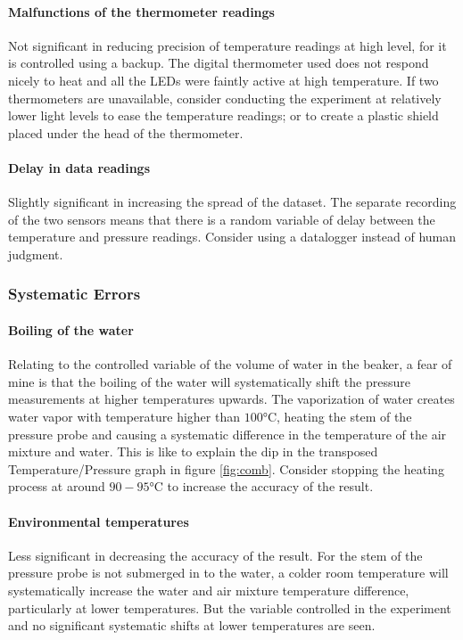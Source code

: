\documentclass[a4paper,12pt]{article}
\begin{document}
\paragraph{Malfunctions of the thermometer readings}
Not significant in reducing precision of temperature readings at high level, for it is controlled using a backup. The digital thermometer used does not respond nicely to heat and all the LEDs were faintly active at high temperature. If two thermometers are unavailable, consider conducting the experiment at relatively lower light levels to ease the temperature readings; or to create a plastic shield placed under the head of the thermometer.

\paragraph{Delay in data readings}
Slightly significant in increasing the spread of the dataset. The separate recording of the two sensors means that there is a random variable of delay between the temperature and pressure readings. Consider using a datalogger instead of human judgment.

\subsubsection{Systematic Errors}
\paragraph{Boiling of the water}
Relating to the controlled variable of the volume of water in the beaker, a fear of mine is that the boiling of the water will systematically shift the pressure measurements at higher temperatures upwards. The vaporization of water creates water vapor with temperature higher than $100\si{\celsius}$, heating the stem of the pressure probe and causing a systematic difference in the temperature of the air mixture and water. This is like to explain the dip in the transposed Temperature/Pressure graph in figure \ref{fig:comb}. Consider stopping the heating process at around $90-95\si{\celsius}$ to increase the accuracy of the result.

\paragraph{Environmental temperatures}
Less significant in decreasing the accuracy of the result. For the stem of the pressure probe is not submerged in to the water, a colder room temperature will systematically increase the water and air mixture temperature difference, particularly at lower temperatures. But the variable controlled in the experiment and no significant systematic shifts at lower temperatures are seen.
\end{document}
